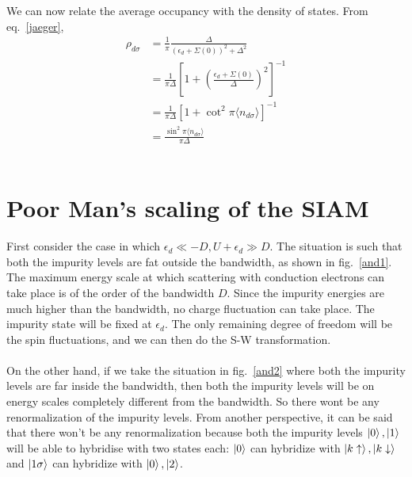 \documentclass[twoside]{report}
\numberwithin{equation}{section}
\begin{document}
We can now relate the average occupancy with the density of states.
From eq.~\ref{jaeger},
\begin{equation}\begin{aligned}
	\rho_{d\sigma} &= \frac{1}{\pi}\frac{\Delta}{\left(\epsilon_d + \Sigma(0)\right)^2 + \Delta^2}\\
		       &= \frac{1}{\pi\Delta}\left[1+\left(\frac{\epsilon_d+\Sigma(0)}{\Delta}\right)^2\right]^{-1}\\
		       &=\frac{1}{\pi\Delta}\left[1+\cot^2\pi\langle  n_{d\sigma}\rangle\right]^{-1}\\
		       &=\frac{\sin^2 \pi\langle  n_{d\sigma}\rangle}{\pi \Delta}
\end{aligned}\end{equation}
\\

\section{Poor Man's scaling of the SIAM}
First consider the case in which \(\epsilon_d \ll -D, U+\epsilon_d \gg D\).
The situation is such that both the impurity levels are fat outside the bandwidth, as shown in fig.~\ref{and1}.
The maximum energy scale at which scattering with conduction electrons can take place is of the order of the bandwidth \(D\).
Since the impurity energies are much higher than the bandwidth, no charge fluctuation can take place.
The impurity state will be fixed at \(\epsilon_d\).
The only remaining degree of freedom will be the spin fluctuations, and we can then do the S-W transformation.\\\\
On the other hand, if we take the situation in fig.~\ref{and2} where both the impurity levels are far inside the bandwidth, then both the impurity levels will be on energy scales completely different from the bandwidth.
So there wont be any renormalization of the impurity levels.
From another perspective, it can be said that there won't be any renormalization because both the impurity levels \(\ket{0},\ket{1}\) will be able to hybridise with two states each: \(\ket{0}\) can hybridize with \(\ket{k\uparrow},\ket{k\downarrow}\) and \(\ket{1\sigma}\) can hybridize with \(\ket{0},\ket{2}\).
\end{document}
